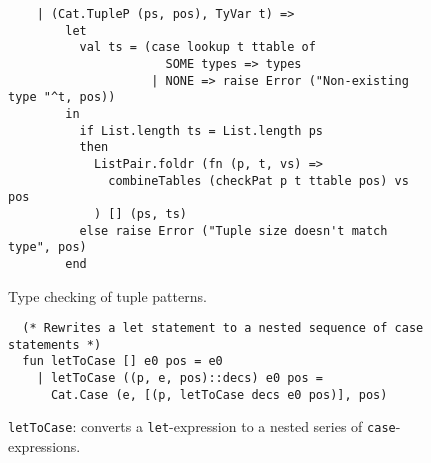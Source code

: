 \begin{figure}
    \centering
    \begin{lstlisting}
    | (Cat.TupleP (ps, pos), TyVar t) =>
        let
          val ts = (case lookup t ttable of
                      SOME types => types
                    | NONE => raise Error ("Non-existing type "^t, pos))
        in
          if List.length ts = List.length ps
          then
            ListPair.foldr (fn (p, t, vs) =>
              combineTables (checkPat p t ttable pos) vs pos
            ) [] (ps, ts)
          else raise Error ("Tuple size doesn't match type", pos)
        end
    \end{lstlisting}
    \label{fig:type:tuplep}
    \caption{Type checking of tuple patterns.}
\end{figure}
\begin{figure}
    \centering
    \begin{lstlisting}
  (* Rewrites a let statement to a nested sequence of case statements *)
  fun letToCase [] e0 pos = e0
    | letToCase ((p, e, pos)::decs) e0 pos =
      Cat.Case (e, [(p, letToCase decs e0 pos)], pos)
    \end{lstlisting}
    \label{fig:type:lettocase}
    \caption{\texttt{letToCase}: converts a \texttt{let}-expression to a nested series of \texttt{case}-expressions.}
\end{figure}

